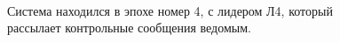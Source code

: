 \documentclass[subf, href, colorlinks=true, 14pt,
times, mtpro, specialist]{disser}
\theoremstyle{definition}
\begin{document}
\
\newpage
\begin{figure}[H]
\vspace{-1cm}
\begin{minipage}[h]{0.46\linewidth}
\begin{small}
Система находился в эпохе номер 4, с лидером Л4, который рассылает контрольные сообщения ведомым. \\
\end{small}
\end{minipage}
\hfill
\begin{minipage}[h]{0.46\linewidth}
\vspace{0.6cm}

\end{minipage}
\end{figure}
\end{document}
